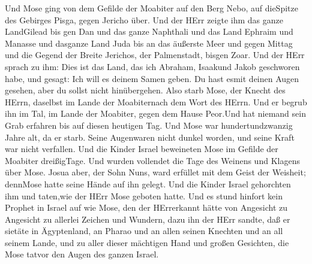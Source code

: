 Und Mose ging von dem Gefilde der Moabiter auf den Berg
Nebo, auf dieSpitze des Gebirges Pisga, gegen Jericho über. Und der HErr
zeigte ihm das ganze LandGilead bis gen Dan  und das ganze
Naphthali und das Land Ephraim und Manasse und dasganze Land Juda bis an
das äußerste Meer  und gegen Mittag und die Gegend der
Breite Jerichos, der Palmenstadt, bisgen Zoar.  Und der HErr
sprach zu ihm: Dies ist das Land, das ich Abraham, Isaakund Jakob
geschworen habe, und gesagt: Ich will es deinem Samen geben. Du hast
esmit deinen Augen gesehen, aber du sollst nicht hinübergehen.
 Also starb Mose, der Knecht des HErrn, daselbst im Lande
der Moabiternach dem Wort des HErrn.  Und er begrub ihn im
Tal, im Lande der Moabiter, gegen dem Hause Peor.Und hat niemand sein
Grab erfahren bis auf diesen heutigen Tag.  Und Mose war
hundertundzwanzig Jahre alt, da er starb. Seine Augenwaren nicht dunkel
worden, und seine Kraft war nicht verfallen.  Und die Kinder
Israel beweineten Mose im Gefilde der Moabiter dreißigTage. Und wurden
vollendet die Tage des Weinens und Klagens über Mose.  Josua
aber, der Sohn Nuns, ward erfüllet mit dem Geist der Weisheit; dennMose
hatte seine Hände auf ihn gelegt. Und die Kinder Israel gehorchten ihm
und taten,wie der HErr Mose geboten hatte.  Und es stund
hinfort kein Prophet in Israel auf wie Mose, den der HErrerkannt hätte
von Angesicht zu Angesicht  zu allerlei Zeichen und
Wundern, dazu ihn der HErr sandte, daß er sietäte in Ägyptenland, an
Pharao und an allen seinen Knechten und an all seinem Lande,
 und zu aller dieser mächtigen Hand und großen Gesichten,
die Mose tatvor den Augen des ganzen Israel.
